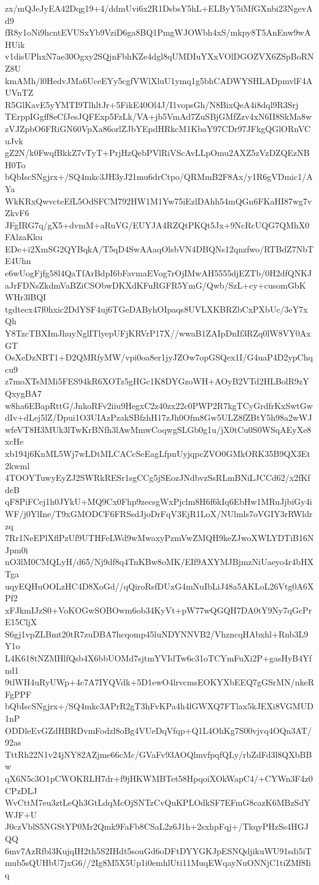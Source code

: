 zx/mQJeJyEA42Dqg19+4/ddmUvi6x2R1DsbsY5hL+ELByY5iMfGXnbi23NgevAd9
fR8y1oNi9hcntEVUSxYb9VziD6ga8BQ1PmgWJOWbh4xS/mkpy8T5AnEnw9wAHUik
v1disUPhxN7ae30Ogxy2SQjnFbhKZe4dgl8qUMDIuYXxVOlDGOZVX6ZSpBoRNZ8U
kmAMh/l0HedvJMa6UceEYy5cgfVWlXluU1ymq1g5bhCADWYSHLADpmvlF4AUVnTZ
R5GlKavE5yYMTI9TlhltJr+5FikE40Ol4J/I1vopsGh/N8BixQeA4i8dql9R3Srj
TErppIGgff8eCfJesJQFExp5FzLk/VA+jb5VmAd7ZuSBjGMfZzv4xN6II8SkMa8w
zVJZpbO6FRiGN60VpXa86orlZJbYEpdHRkcM1KbaY97CDr97JFkgQGlORnVCuJvk
gZ2N/k0FwqfBkkZ7vTyT+PrjHzQebPVlRiVScAvLLpOmu2AXZ5zVzDZQEzNBH0To
bQbIscSNgjrx+/SQ4mkc3JH3yJ21mu6drCtpo/QRMmB2F8Ax/y1R6gVDmic1/AYa
WkKRxQwvcteEfL5OdSFCM792HW1M1Yw75iEzlDAhh54mQGn6FKaHI87wg7vZkvF6
JFgIRG7q/gX5+dvmM+aRuVG/EUYJA4RZQtPKQt5Jx+9NcRcUQG7QMhX0FAlzaKku
EDe+i2XmSG2QYBqkA/T5qD4SwAAaqOlsbVN4DBQNs12qnzfwo/RTBdZ7NbTE4Uhn
e6wUogFjfg58l4QaTfArBdpI6bFavmaEVog7rOjIMwAH5555djEZTb/0H2dfQNKJ
aJrFDNsZkdmVaBZiCSObwDKXdKFuRGFR5YmG/Qwb/SzL+cy+cusomGbKWHr3lBQI
tgdtecx47f0hxic2DdYSF4uj6TGeDAByhOIpaqs8UVLXKBRZbCxPXbUc/3eY7xQh
Y8TzcTBXImJhuyNglITlyepUFjKRVrP17X//wwaB1ZAIpDnIf3RZq0lW8VY0AxGT
OsXeDzNBT1+D2QMRfyMW/vpi0oa8er1jyJZOw7opGSQex1I/G4uaP4D2ypChqcu9
z7moXTsMMi5FES94kR6XOTz5gHGc1K8DYGzoWH+AOyB2VTd2HLBolR9zYQxygBA7
w8ha6EBapRttG/JnkoRFv2iiu9HegxC2z40zx22c0PWP2R7kgTCyGrdfrKxSwtGw
dIv+dLej5lZ/Dpui1O3UIAzPzakSBfzhH17zJh0Ofm8Gw5ULZ8fZBtY5h98a2wWJ
wfeVT8H3MUk3lTwKrBNfh3lAwMmwCoqwgSLGb0g1u/jX0tCu0S0WSqAEyXe8xcHe
xb194j6KnML5Wj7wLDtMLCACcSeEagLfpnUyjqpcZVO0GMkORK35B9QX3Et2kwml
4TOOYTuwyEyZJ2SWRkRESr1sgCCg5jSEozJNdbvzSsRLmBNiLJCCd62/x2fKfdeB
qF8PiFCej1h0JYkU+MQ9Cx0Fhp9zecsgWxPjclm8H6f6kIq6EbHw1MRuJjbiGy4i
WF/j0YlIne/T9xGMODCF6FRSsdJjoDrFqV3EjR1LoX/NUlmls7oVGIY3rRWldrzq
7Rr1NeEPlXflPzUf9UTHFeLWd9wMwaxyPzmVwZMQH9keZJwoXWLYDTiB16NJpm0i
nO3lM0CMQLyH/d65/Nj9df8q4TnKBw8oMK/EIf9AXYMJBjmzNiUaeyo4r4bHXTga
uqyEQHuOOLzHC4D8XoGd//qQiroRsfDUxG4mNuIbLiJ48a5AKLoL26Vtg0A6XPf2
xFJkmIJzS0+VoKOGwSOBOwm6ob34KyVt+pW77wQGQH7DA0tY9Ny7qGcPrE15CljX
S6gj1vpZLBmt20tR7zuDBA7hcqomp45luNDYNNVB2/VhzncqHAbxhl+Rnb3L9Y1o
L4K618tNZMHlfQsb4X6bbUOMd7sjtmYVIdTw6c31oTCYmFuXi2P+gasHyB4Yfnd1
9tlWH4uRyUWp+4c7A7IYQVdk+5D1ewO4lrvcmsEOKYXbEEQ7gGSrMN/nkeRFgPPF
bQbIscSNgjrx+/SQ4mkc3APrR2gT3hFvKPa4h4lGWXQ7FTlax5kJEXi8VGMUD1nP
ODDleEvGZdHBRDvmFodzl8oBg4VUeDqVfqp+Q1L4OhKg7S00vjvq4OQn3AT/92as
TttRh22N1v24jNY82AZjme66cMc/GVaFv93AOQlmvfpqfQLy/rbZdFd3l8QXbBBw
qX6N5c3O1pCWOKRLH7dr+f9jHKWMBTet58HpqoiXOkWapC4/+CYWn3F4z0CPzDLJ
WvCttM7eu3ztLeQh3GtLdqMcOjSNTzCvQuKPLOdkSF7EFmG8cazK6MBzSdYWJF+U
J0czVblS5NGStYP0Mr2Qmk9FaFb8CSaL2z6J1h+2sxhpFqj+/TkqyPHzSs4HGJQQ
6mv7AzRfbl3KujqIH2th5S2IHdt5souGd6oDFtDYYGKJpESNQdjikuWU91sdi5iT
mub5sQUHbU7jxG6//2Ig8M5X5Up1i0emhlUti11MuqEWqayNuONNjC1tiZMf8Iiq
